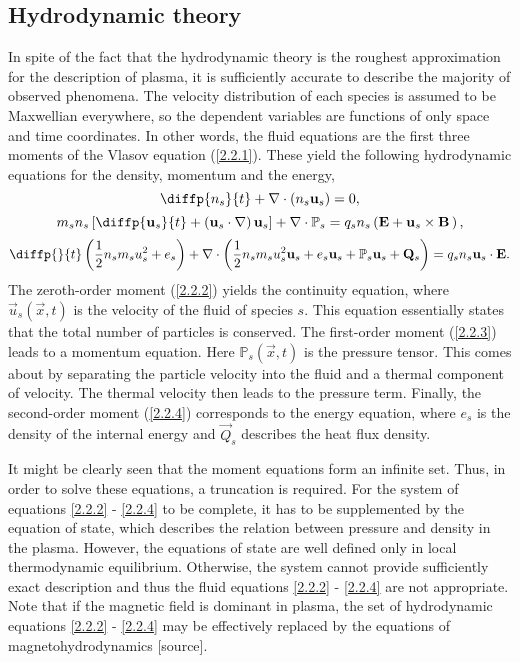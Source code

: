 \subsection{Hydrodynamic theory}
In spite of the fact that the hydrodynamic theory is the roughest approximation for the description of plasma, it is sufficiently accurate to describe the majority of observed phenomena. The velocity distribution of each species is assumed to be Maxwellian everywhere, so the dependent variables are functions of only space and time coordinates. In other words, the fluid equations are the first three moments of the Vlasov equation (\ref{2.2.1}). These yield the following hydrodynamic equations for the density, momentum and the energy,
\begin{equation}
\label{2.2.2}
\diffp{n_s}{t} + \nabla \cdot \left(n_s \vec{u}_s \right) = 0,
\end{equation}
\begin{equation}
\label{2.2.3}
m_s n_s \left[ \diffp{\vec{u}_s}{t} + \left(\vec{u}_s \cdot \nabla \right) \vec{u}_s \right] + \nabla \cdot \mathbb{P}_s = q_s n_s \left(\vec{E} + \vec{u}_s \times \vec{B} \, \right),
\end{equation}
\begin{equation}
\label{2.2.4}
\diffp{}{t} \left(\frac{1}{2} n_s m_s u_s^2 + e_{s} \right) + \nabla \cdot \left(\frac{1}{2} n_s m_s u_s^2 \vec{u}_s + e_{s} \vec{u}_s + \mathbb{P}_s \vec{u}_s + \vec{Q}_s \right) = q_s n_s \vec{u}_s \cdot \vec{E}.
\end{equation}
The zeroth-order moment (\ref{2.2.2}) yields the continuity equation, where $ \vec{u}_s\left(\vec{x}, t \right) $ is the velocity of the fluid of species $ s $. This equation essentially states that the total number of particles is conserved. The first-order moment (\ref{2.2.3}) leads to a momentum equation. Here $ \mathbb{P}_s\left(\vec{x}, t \right) $ is the pressure tensor. This comes about by separating the particle velocity into the fluid and a thermal component of velocity. The thermal velocity then leads to the pressure term. Finally, the second-order moment (\ref{2.2.4}) corresponds to the energy equation, where $ e_{s} $ is the density of the internal energy and $ \vec{Q}_s $ describes the heat flux density.

It might be clearly seen that the moment equations form an infinite set. Thus, in order to solve these equations, a truncation is required. For the system of equations \ref{2.2.2} - \ref{2.2.4} to be complete, it has to be supplemented by the equation of state, which describes the relation between pressure and density in the plasma. However, the equations of state are well defined only in local thermodynamic equilibrium. Otherwise, the system cannot provide sufficiently exact description and thus the fluid equations \ref{2.2.2} - \ref{2.2.4} are not appropriate. Note that if the magnetic field is dominant in plasma, the set of hydrodynamic equations \ref{2.2.2} - \ref{2.2.4} may be effectively replaced by the equations of magnetohydrodynamics [source].